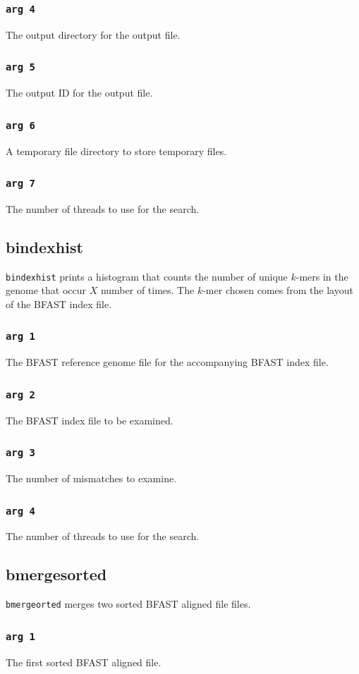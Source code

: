 \documentclass[a4paper,12pt]{book}
\newcommand{\TT}[1]{{\tt #1}} %
\newcommand{\BRGF}{BFAST reference genome file} %
\newcommand{\BIF}{BFAST index file} %
\newcommand{\BAF}{BFAST aligned file} %
\begin{document}
\subsubsection{\TT{arg 4}}
The output directory for the output file.
\subsubsection{\TT{arg 5}}
The output ID for the output file.
\subsubsection{\TT{arg 6}}
A temporary file directory to store temporary files.
\subsubsection{\TT{arg 7}}
The number of threads to use for the search.

\subsection{bindexhist}
\label{sec:bindexhist}
\TT{bindexhist} prints a histogram that counts the number of unique $k$-mers in the genome that occur $X$ number of
times.  
The $k$-mer chosen comes from the layout of the \BIF{}.

\subsubsection{\TT{arg 1}}
The \BRGF{} for the accompanying \BIF{}.
\subsubsection{\TT{arg 2}}
The \BIF{} to be examined.
\subsubsection{\TT{arg 3}}
The number of mismatches to examine.
\subsubsection{\TT{arg 4}}
The number of threads to use for the search.
\subsection{bmergesorted}
\TT{bmergeorted} merges two sorted \BAF{} files.
\subsubsection{\TT{arg 1}}
The first sorted \BAF{}.
\end{document}
